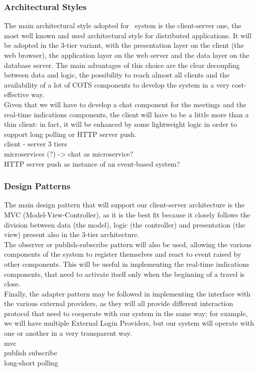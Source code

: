 \subsubsection{Architectural Styles}

The main architectural style adopted for \projectname~system is the client-server one, the most well known and used architectural style for
distributed applications. It will be adopted in the 3-tier variant, with the presentation layer on the client (the web browser), the application layer on the web server and the data layer on the database server. The main advantages of this choice are the clear decoupling between data and logic, the possibility to reach almost all clients and the availability of a lot of COTS components to develop the system in a very cost-effective way. \\
Given that we will have to develop a chat component for the meetings and the real-time indications components, the client will have to be a little more than a thin client: in fact, it will be enhanced by some lightweight logic in order to support long polling or HTTP server push. \\

client - server 3 tiers \\
microservices (?) -> chat as microservice? \\
HTTP server push as instance of an event-based system?

\subsubsection{Design Patterns}

The main design pattern that will support our client-server architecture is the MVC (Model-View-Controller), as it is the best fit because it closely follows the division between data (the model), logic (the controller) and presentation (the view) present also in the 3-tier architecture. \\
The observer or publish-subscribe pattern will also be used, allowing the various components of the system to register themselves and react to event raised by other components. This will be useful in implementing the real-time indications components, that need to activate itself only when the beginning of a travel is close. \\
Finally, the adapter pattern may be followed in implementing the interface with the various external providers, as they will all provide different interaction protocol that need to cooperate with our system in the same way; for example, we will have multiple External Login Providers, but our system will operate with one or another in a very transparent way. \\

mvc \\
publish subscribe \\
long-short polling